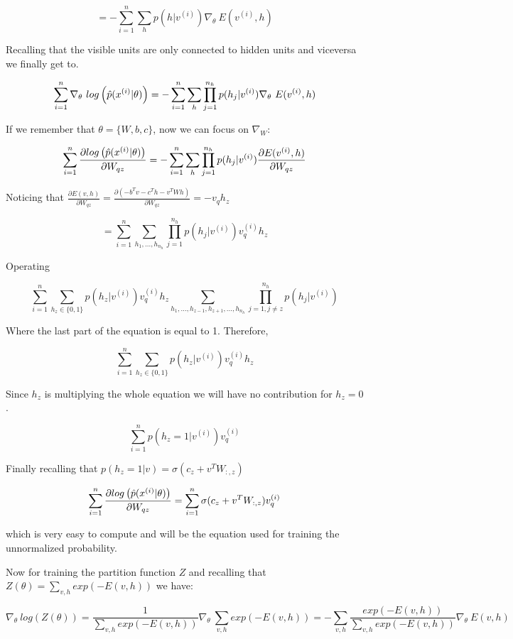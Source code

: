 $$ = - \sum_{i=1}^n \sum_h p(h | v^{(i)}) \nabla_{\theta}~  E (v^{(i)}, h)  $$

\noindent Recalling that the visible units are only connected to hidden units and viceversa we finally get to.

$$ \sum_{i=1}^n \nabla_{\theta}~ log \left( \Hat{p} (x^{(i)} | \theta)  \right) = - \sum_{i=1}^n \sum_h \prod_{j=1}^{n_h} p(h_j | v^{(i)}) \nabla_{\theta}~  E (v^{(i)}, h)  $$

\noindent If we remember that $\theta = \{ W, b, c \}$, now we can focus on $\nabla_W$:

$$ \sum_{i=1}^{n} \frac{\partial log \left( \Hat{p} (x^{(i)} | \theta) \right) }{\partial W_{qz}} = - \sum_{i=1}^n \sum_h \prod_{j=1}^{n_h} p(h_j | v^{(i)}) \frac{\partial  E (v^{(i)}, h)}{\partial W_{qz}} $$

\noindent Noticing that $\frac{\partial E(v, h)}{\partial W_{qz}} = \frac{\partial (-b^T v - c^T h - v^T W h) }{\partial W_{qz}} = -v_q h_z$

$$ = \sum_{i=1}^n \sum_{h_1, ..., h_{n_h}} \prod_{j=1}^{n_h} p(h_j | v^{(i)}) v_q^{(i)} h_z $$ 

\noindent Operating

$$\sum_{i=1}^n \sum_{h_z \in \{0, 1\} } p(h_z | v^{(i)}) v_q^{(i)} h_z \sum_{h_1, ..., h_{z-1}, h_{z+1}, ..., h_{n_h}} \prod_{j=1, j\neq z}^{n_h} p(h_j|v^{(i)}) $$

\noindent Where the last part of the equation is equal to 1. Therefore,

$$ \sum_{i=1}^n \sum_{h_z \in \{0, 1\} } p(h_z | v^{(i)}) v_q^{(i)} h_z $$

\noindent Since $h_z$ is multiplying the whole equation we will have no contribution for $h_z = 0$.

$$ \sum_{i=1}^n p(h_z = 1 | v^{(i)}) v_q^{(i)} $$

\noindent Finally recalling that $p(h_z = 1 | v) = \sigma (c_z + v^T W_{:, z})$

$$ \sum_{i=1}^{n} \frac{\partial log \left( \Hat{p} (x^{(i)} | \theta) \right) }{\partial W_{qz}} = \sum_{i=1}^{n} \sigma (c_z + v^T W_{:, z}) v_q^{(i)}  $$

which is very easy to compute and will be the equation used for training the unnormalized probability.

\noindent Now for training the partition function $Z$ and recalling that $Z(\theta) = \sum_{v,h} exp \left( -E(v, h) \right) $ we have:

$$ \nabla_{\theta}~ log \left( Z(\theta) \right) =  \frac{1}{\sum_{v, h} exp \left( -E (v, h) \right)} \nabla_{\theta}~ \sum_{v, h} exp \left( -E (v, h) \right) = - \sum_{v, h} \frac{exp \left( -E (v, h) \right)}{\sum_{v, h} exp \left( -E (v, h) \right)} \nabla_{\theta}~  E (v, h)$$

